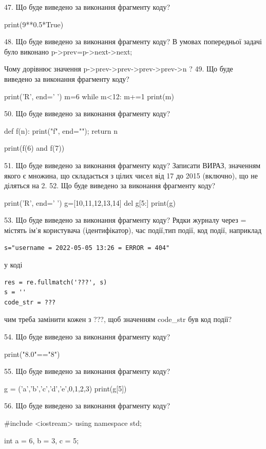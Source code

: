 \documentclass[11pt]{article}
\begin{document}
47. Що буде виведено за виконання фрагменту коду?

print(9**0.5*True)

48. Що буде виведено за виконання фрагменту коду?
В умовах попередньої задачі було виконано p->prev=p->next->next;

Чому дорівнює значення p->prev->prev->prev->prev->n ?
49. Що буде виведено за виконання фрагменту коду?

print('R', end=' ')
m=6
while m<12:
    m+=1
print(m)


50. Що буде виведено за виконання фрагменту коду?

def f(n):
    print("f", end="");
    return n

print(f(6) and f(7))

51. Що буде виведено за виконання фрагменту коду?
Записати ВИРАЗ, значенням якого є множина, що складається з цілих чисел від 17 до 2015 (включно), що не діляться на 2.
52. Що буде виведено за виконання фрагменту коду?

print('R', end=' ')
g=[10,11,12,13,14]
del g[5:]
print(g)


53. Що буде виведено за виконання фрагменту коду?
Рядки журналу через = містять ім'я користувача (ідентифікатор), час події,тип події, код події, наприклад
\begin{verbatim}
s="username = 2022-05-05 13:26 = ERROR = 404"
\end{verbatim}
у коді 
\begin{verbatim}
res = re.fullmatch('???', s) 
s = ''
code_str = ??? 
\end{verbatim}
чим треба замінити кожен з ???, щоб значенням code\_str був код події? 



54. Що буде виведено за виконання фрагменту коду?

print("8.0"=="8")

55. Що буде виведено за виконання фрагменту коду?

g = ('a','b','c','d','e',0,1,2,3)
print(g[5])


56. Що буде виведено за виконання фрагменту коду?

#include <iostream>
using namespace std;

int a = 6, b = 3, c = 5;
\end{document}
